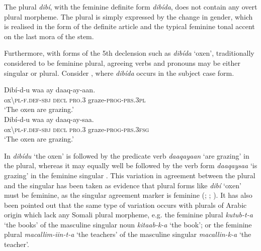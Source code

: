 \documentclass[output=paper]{langsci/langscibook}
\begin{document}
The plural \textit{dibí}, with the feminine definite form \textit{dibída}, does not contain any overt plural morpheme. The plural is simply expressed by the change in gender, which is realised in the form of the definite article and the typical feminine tonal accent on the last mora of the stem. 

Furthermore, with forms of the 5th declension such as \textit{dibída} ‘oxen’, traditionally considered to be feminine plural, agreeing verbs and pronouns may be either singular or plural. Consider , where \textit{dibída} occurs in the subject case form.

\ea\label{ex:nilsson:1}
\ea\label{ex:nilsson:1a}
\gll  Dibí-d-u             waa  ay{\rmfnm}   daaq-ay-aan.   \\
        ox{\textbackslash}\textsc{pl-f.def-sbj}  \textsc{decl}   \textsc{pro.3}   graze-\textsc{prog-prs.3pl}\\
\glt      ‘The oxen are grazing.’\\
\ex\label{ex:nilsson:1b}
\gll   Dibí-d-u        waa  ay   daaq-ay-saa.\\
       ox{\textbackslash}\textsc{pl-f.def-sbj}  \textsc{decl}   \textsc{pro.3}  graze-\textsc{prog-prs.3fsg}\\
\glt   ‘The oxen are grazing.’
\z
\z


In  \textit{dibídu} ‘the oxen’ is followed by the predicate verb \textit{daaqayaan} ‘are grazing’ in the plural, whereas it may equally well be followed by the verb form \textit{daaqaysaa} ‘is grazing’ in the feminine singular . This variation in agreement between the plural and the singular has been taken as evidence that plural forms like \textit{dibí} ‘oxen’ must be feminine, as the singular agreement marker is feminine (\citealt[259--260]{Hetzron1972}; \citealt[391--393]{ZwickyPullum1983}; \citealt[134--137]{Lecarme2002}). It has also been pointed out that the same type of variation occurs with plurals of Arabic origin which lack any Somali plural morpheme, e.g. the feminine plural \textit{kutub-t-a} ‘the books’ of the masculine singular noun \textit{kitaab-k-a} ‘the book’; or the feminine plural \textit{macallim-iin-t-a} ‘the teachers’ of the masculine singular \textit{macallin-k-a} ‘the teacher’.
\end{document}
